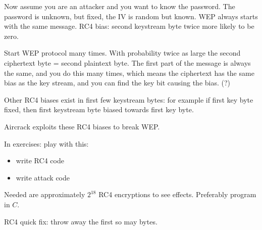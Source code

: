 \documentclass[language=english,number=]{homework}
\begin{document}
Now assume you are an attacker and you want to know the password.
    The password is unknown, but fixed, the IV is random but known.
    WEP always starts with the same message.
    RC4 bias: second keystream byte twice more likely to be zero.

    Start WEP protocol many times.
    With probability twice as large the second ciphertext byte = second plaintext byte.
    The first part of the message is always the same, and you do this many times, which means the ciphertext has the same bias as the key stream, and you can find the key bit causing the bias. (?)

    Other RC4 biases exist in first few keystream bytes: for example if first key byte fixed, then first keystream byte biased towards first key byte.

    Aircrack exploits these RC4 biases to break WEP.

    In exercises: play with this:
    \begin{itemize}
        \item write RC4 code
        \item write attack code
    \end{itemize}
    Needed are approximately $2^{18}$ RC4 encryptions to see effects.
    Preferably program in $C$.

    RC4 quick fix: throw away the first so may bytes.
\end{document}
